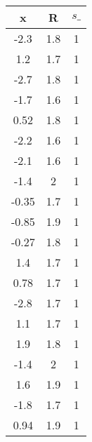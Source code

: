 \begin{tiny}\begin{tabular}{|c|c|c|}
\hline
\textbf{x}&\textbf{R}&\textbf{$s\_$}\\\hline
-2.3&1.8&1\\\hline
1.2&1.7&1\\\hline
-2.7&1.8&1\\\hline
-1.7&1.6&1\\\hline
0.52&1.8&1\\\hline
-2.2&1.6&1\\\hline
-2.1&1.6&1\\\hline
-1.4&2&1\\\hline
-0.35&1.7&1\\\hline
-0.85&1.9&1\\\hline
-0.27&1.8&1\\\hline
1.4&1.7&1\\\hline
0.78&1.7&1\\\hline
-2.8&1.7&1\\\hline
1.1&1.7&1\\\hline
1.9&1.8&1\\\hline
-1.4&2&1\\\hline
1.6&1.9&1\\\hline
-1.8&1.7&1\\\hline
0.94&1.9&1\\\hline
\end{tabular}
\end{tiny}